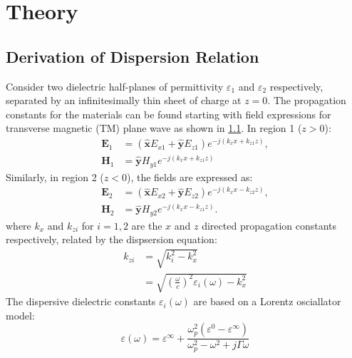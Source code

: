\documentclass[conference, 10pt]{IEEEtran}
\renewcommand{\v}[1]{\mathbf{#1}} %
\renewcommand{\O}{\omega}  %
\newcommand{\E}{\varepsilon}  %
\renewcommand{\inf}{\infty}  %
\renewcommand{\^}{\hat}  %
\begin{document}
\section{Theory}

\subsection{Derivation of Dispersion Relation}
%
Consider two dielectric half-planes of permittivity $\E_1$ and $\E_2$ respectively, separated by an infinitesimally thin sheet of charge at $z = 0$. The propagation constants for the materials can be found starting with field expressions for transverse magnetic (TM) plane wave as shown in \ref{}. In region 1 ($z > 0$):
%
\begin{subequations}
  \begin{align}
    \v E_1 &=  \left(\v{\^{x}} E_{x1} + \v{\^{y}} E_{z1} \right) e^{-j (k_x x + k_{z1}z)},
    \label{eq:E_1}\\
    \v H_1 &=  \v{\^{y}} H_{y1} e^{-j (k_x x + k_{z1}z)}
    \label{eq:H_1}
  \end{align}
  \label{eq:r_1}
\end{subequations}
%
Similarly, in region 2 ($z < 0$), the fields are expressed as:
%
\begin{subequations}
  \begin{align}
    \v E_2 &=  \left(\v{\^{x}} E_{x2} + \v{\^{y}} E_{z2} \right) e^{-j (k_x x - k_{z2}z)},
    \label{eq:E_1}\\
    \v H_2 &=  \v{\^{y}} H_{y2} e^{-j (k_x x - k_{z1}z)}.
    \label{eq:H_1}
  \end{align}
  \label{eq:r_1}
\end{subequations}
%
where $k_x$ and $k_{zi}$ for $i = 1,2$ are the $x$ and $z$ directed propagation constants respectively, related by the dispsersion equation:
%
\begin{equation}
  \begin{split}
    k_{zi} & = \sqrt{k_i^2 - k_x^2} \\
    & = \sqrt{\left(\frac{\O}{c}\right)^2 \E_i(\O) -  k_x^2}
  \end{split}
  \label{eq:kz}
\end{equation}
%
The dispersive dielectric constants $\E_i(\O)$ are based on a Lorentz osciallator model:
%
\begin{equation}
  \E(\O) = \E^{\inf} + \frac{\O_p^2 (\E^0 - \E^{\inf})}{\O_p^2 - \O^2 + j \Gamma \O}
  \label{eq:eps}
\end{equation}
\end{document}
